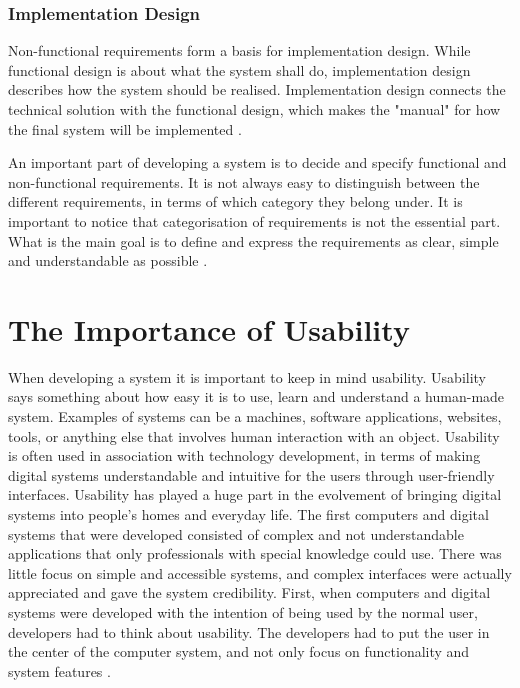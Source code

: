\subsubsection{Implementation Design}
Non-functional requirements form a basis for implementation design. While functional design is about what the system shall do, implementation design describes how the system should be realised. Implementation design connects the technical solution with the functional design, which makes the "manual" for how the final system will be implemented \cite{systemutviklingDel1}.  

An important part of developing a system is to decide and specify functional and non-functional requirements. It is not always easy to distinguish between the different requirements, in terms of which category they belong under. It is important to notice that categorisation of requirements is not the essential part. What is the main goal is to define and express the requirements as clear, simple and understandable as possible \cite{systemutviklingDel1}.  

\section{The Importance of Usability}
\label{sec:usability}
When developing a system it is important to keep in mind usability. Usability says something about how easy it is to use, learn and understand a human-made system. Examples of systems can be a machines, software applications, websites, tools, or anything else that involves human interaction with an object. Usability is often used in association with technology development, in terms of making digital systems understandable and intuitive for the users through user-friendly interfaces. Usability has played a huge part in the evolvement of bringing digital systems into people's homes and everyday life. The first computers and digital systems that were developed consisted of complex and not understandable applications that only professionals with special knowledge could use. There was little focus on simple and accessible systems, and complex interfaces were actually appreciated and gave the system credibility. First, when computers and digital systems were developed with the intention of being used by the normal user, developers had to think about usability. The developers had to put the user in the center of the computer system, and not only focus on functionality and system features \cite{mmi}.

